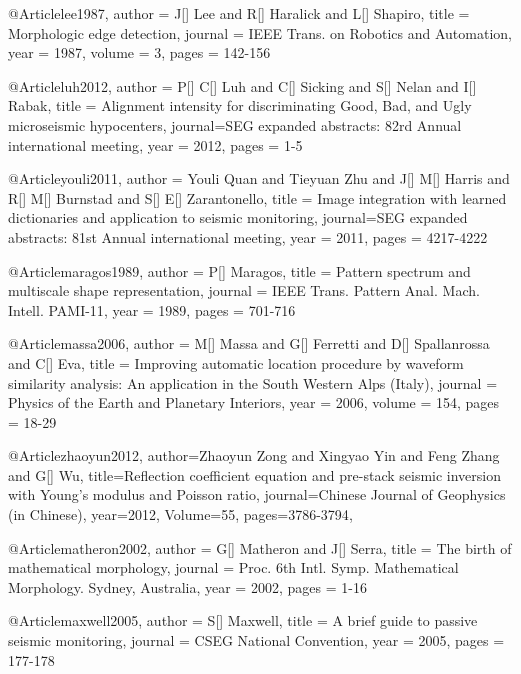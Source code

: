      @Article{lee1987,
  author = 	 {J[] Lee and R[] Haralick and L[] Shapiro},
  title = 	 {Morphologic edge detection},
  journal = 	 {IEEE Trans. on Robotics and
Automation},
  year = 	 1987,
  volume = 	 3,
  pages = 	 {142-156}}   

     @Article{luh2012,
  author = 	 {P[] C[] Luh and C[] Sicking and S[] Nelan and I[] Rabak},
  title = 	 {Alignment intensity for discriminating Good, Bad, and Ugly microseismic hypocenters},
  journal={SEG expanded abstracts: 82rd Annual international meeting},
  year = 	 2012,
  pages = 	 {1-5}}  

     @Article{youli2011,
  author = 	 {Youli Quan and Tieyuan Zhu and J[] M[] Harris and R[] M[] Burnstad and S[] E[] Zarantonello},
  title = 	 {Image integration with learned dictionaries and application to seismic monitoring},
  journal={SEG expanded abstracts: 81st Annual international meeting},
  year = 	 2011,
  pages = 	 {4217-4222}} 
    
     @Article{maragos1989,
  author = 	 {P[] Maragos},
  title = 	 {Pattern spectrum and multiscale shape representation},
  journal = 	 {IEEE Trans. Pattern Anal.
Mach. Intell. PAMI-11},
  year = 	 1989,
  pages = 	 {701-716}}     
  

     @Article{massa2006,
  author = 	 {M[] Massa and G[] Ferretti and D[] Spallanrossa and C[] Eva},
  title = 	 {Improving automatic location procedure by waveform similarity analysis: An application in the South Western Alps (Italy)},
  journal = 	 {Physics of the Earth and Planetary Interiors},
  year = 	 2006,
  volume = 	 154,
  pages = 	 {18-29}}  



@Article{zhaoyun2012,
  author={Zhaoyun Zong and Xingyao Yin and Feng Zhang and G[] Wu},
  title={Reflection coefficient equation and pre-stack seismic inversion with Young's modulus and Poisson ratio},
  journal={Chinese Journal of Geophysics (in Chinese)},
  year=2012,
  Volume=55,
  pages={3786-3794},
}


  
  
      @Article{matheron2002,
  author = 	 {G[] Matheron and J[] Serra},
  title = 	 {The birth of mathematical morphology},
  journal = 	 {Proc. 6th Intl. Symp.
Mathematical Morphology. Sydney, Australia},
  year = 	 2002,
  pages = 	 {1-16}}   

     @Article{maxwell2005,
  author = 	 {S[] Maxwell},
  title = 	 {A brief guide to passive seismic monitoring},
  journal = 	 {CSEG National Convention},
  year = 	 2005,
  pages = 	 {177-178}}   
  
